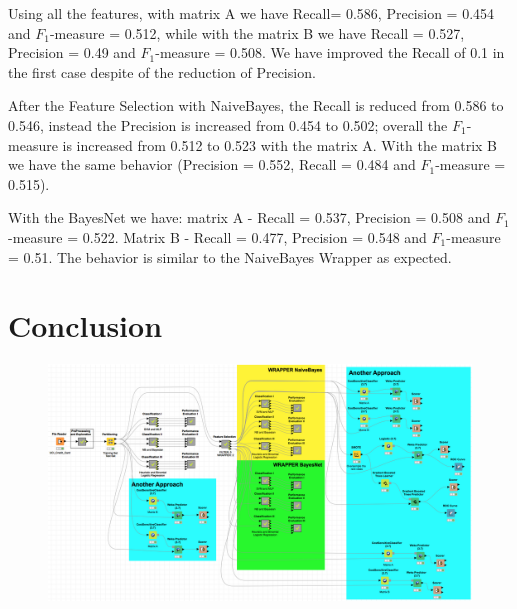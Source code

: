 \documentclass[fleqn,10pt]{SelfArx} %
\begin{document}
Using all the features, with matrix A we have Recall= 0.586, Precision = 0.454 and $F_1$-measure = 0.512, while with the matrix B we have Recall = 0.527, Precision = 0.49 and $F_1$-measure = 0.508. 
We have improved the Recall of 0.1 in the first case despite of the reduction of Precision.

After the Feature Selection with NaiveBayes, the Recall is reduced from 0.586 to 0.546, instead the Precision is increased from 0.454 to 0.502; overall the $F_1$-measure is increased from 0.512 to 0.523 with the matrix A. 
With the matrix B we have the same behavior (Precision = 0.552, Recall = 0.484 and $F_1$-measure = 0.515). 

With the BayesNet we have: matrix A - Recall = 0.537, Precision = 0.508 and $F_1$-measure = 0.522. Matrix B - Recall = 0.477, Precision = 0.548 and $F_1$-measure = 0.51. 
The behavior is similar to the NaiveBayes Wrapper as expected.  

\section{Conclusion}




	\newpage
	\nocite{DataSet}
	\nocite{LucaNoteBook}
	\nocite{Default}
	\nocite{ItalPress}
	
	
	
	
	\begin{figure}[h]
		\includegraphics[width=\linewidth]{Workflow.png}
	\end{figure}
\end{document}

